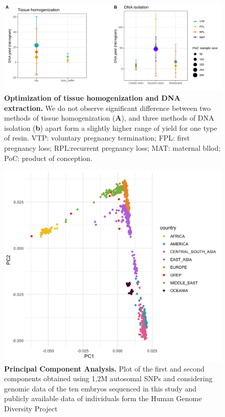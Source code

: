 \begin{figure}[ht]
    \centering
    \includegraphics[width= 14 cm, high= 16cm]{fig/panelDNA.png}
    \caption{\textbf{Optimization of tissue homogenization and DNA extraction.} We do not observe significant difference between two methods of tissue homogenization (\textbf{A}), and three methods of DNA isolation (\textbf{b}) apart form a slightly higher range of yield for one type of resin. VTP: voluntary pregnancy termination;  FPL: first pregnancy loss; RPL:recurrent pregnancy loss;  MAT: maternal bllod; PoC: product of conception.}
    \label{fig:dna}
\end{figure}




\begin{figure}[ht]
    \centering
    \includegraphics[width= 14 cm, high= 16cm]{fig/pca_hgdp-grep_noALPHA.png}
    \caption{\textbf{Principal Component Analysis.} Plot of the first and second components obtained using 1,2M autosomal SNPs and considering genomic data of the ten embryos sequenced in this study and publicly available data of individuals form the Human Genome Diversity Project}
    \label{fig:pca}
\end{figure}


